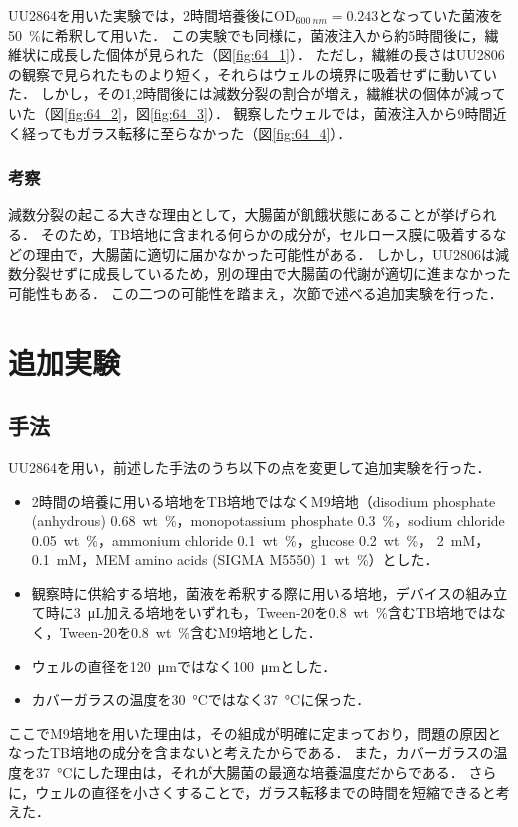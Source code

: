 \documentclass[a4paper,11pt,titlepage]{jsarticle}
\begin{document}
UU2864を用いた実験では，2時間培養後に$\mathrm{OD}_{\SI{600}{nm}}=0.243$となっていた菌液を\SI{50}{\%}に希釈して用いた．
この実験でも同様に，菌液注入から約5時間後に，繊維状に成長した個体が見られた（図\ref{fig:64_1}）．
ただし，繊維の長さはUU2806の観察で見られたものより短く，それらはウェルの境界に吸着せずに動いていた．
しかし，その1,2時間後には減数分裂の割合が増え，繊維状の個体が減っていた（図\ref{fig:64_2}，図\ref{fig:64_3}）．
観察したウェルでは，菌液注入から9時間近く経ってもガラス転移に至らなかった（図\ref{fig:64_4}）．

\subsubsection{考察}
減数分裂の起こる大きな理由として，大腸菌が飢餓状態にあることが挙げられる．
そのため，TB培地に含まれる何らかの成分が，セルロース膜に吸着するなどの理由で，大腸菌に適切に届かなかった可能性がある．
しかし，UU2806は減数分裂せずに成長しているため，別の理由で大腸菌の代謝が適切に進まなかった可能性もある．
この二つの可能性を踏まえ，次節で述べる追加実験を行った．

\section{追加実験}

\subsection{手法}
UU2864を用い，前述した手法のうち以下の点を変更して追加実験を行った．
\begin{itemize}
  \item 2時間の培養に用いる培地をTB培地ではなくM9培地（disodium phosphate (anhydrous) \SI{0.68}{wt\%}，monopotassium phosphate \SI{0.3}{\%}，sodium chloride \SI{0.05}{wt\%}，ammonium chloride \SI{0.1}{wt\%}，glucose \SI{0.2}{wt\%}， \SI{2}{mM}， \SI{0.1}{mM}，MEM amino acids (SIGMA M5550) \SI{1}{wt\%}）とした．
  \item 観察時に供給する培地，菌液を希釈する際に用いる培地，デバイスの組み立て時に\SI{3}{\uL}加える培地をいずれも，Tween-20を\SI{0.8}{wt\%}含むTB培地ではなく，Tween-20を\SI{0.8}{wt\%}含むM9培地とした．
  \item ウェルの直径を\SI{120}{\um}ではなく\SI{100}{\um}とした．
  \item カバーガラスの温度を\SI{30}{\degreeCelsius}ではなく\SI{37}{\degreeCelsius}に保った．
\end{itemize}
ここでM9培地を用いた理由は，その組成が明確に定まっており，問題の原因となったTB培地の成分を含まないと考えたからである．
また，カバーガラスの温度を\SI{37}{\degreeCelsius}にした理由は，それが大腸菌の最適な培養温度だからである．
さらに，ウェルの直径を小さくすることで，ガラス転移までの時間を短縮できると考えた．
\end{document}
